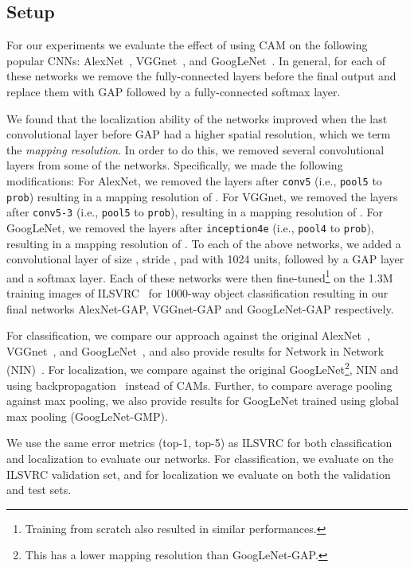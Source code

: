 \documentclass[10pt,twocolumn,letterpaper]{article}
\begin{document}
\subsection{Setup}
\label{sec:locsetup}
For our experiments we evaluate the effect of using CAM on the following popular CNNs: AlexNet~\cite{krizhevsky2012imagenet}, VGGnet~\cite{simonyan2014very}, and GoogLeNet~\cite{szegedy2014going}. In general, for each of these networks we remove the fully-connected layers before the final output and replace them with GAP followed by a fully-connected softmax layer. 

We found that the localization ability of the networks improved when the last convolutional layer before GAP had a higher spatial resolution, which we term the \textit{mapping resolution}. In order to do this, we removed several convolutional layers from some of the networks. Specifically, we made the following modifications: For AlexNet, we removed the layers after \texttt{conv5}
(i.e., \texttt{pool5} to \texttt{prob}) resulting in a mapping resolution of . For VGGnet, we removed the layers after \texttt{conv5-3} (i.e., \texttt{pool5} to \texttt{prob}), resulting in a mapping resolution of . For GoogLeNet, we removed the layers after \texttt{inception4e} (i.e., \texttt{pool4} to \texttt{prob}), resulting in a mapping resolution of . To each of the above networks, we added a convolutional layer of size , stride , pad  with 1024 units, followed by a GAP layer and a softmax layer. Each of these networks were then fine-tuned\footnote{Training from scratch also resulted in similar performances.} on the 1.3M training images of ILSVRC~\cite{ILSVRCijcv15} for 1000-way object classification resulting in our final networks AlexNet-GAP, VGGnet-GAP and GoogLeNet-GAP respectively.

For classification, we compare our approach against the original AlexNet~\cite{krizhevsky2012imagenet}, VGGnet~\cite{simonyan2014very}, and GoogLeNet~\cite{szegedy2014going}, and also provide results for Network in Network (NIN)~\cite{lin2013network}. For localization, we compare against the original GoogLeNet\footnote{This has a lower mapping resolution than GoogLeNet-GAP.}, NIN and using backpropagation~\cite{simonyan2013deep} instead of CAMs. Further, to compare average pooling against max pooling, we also provide results for GoogLeNet trained using global max pooling (GoogLeNet-GMP).

We use the same error metrics (top-1, top-5) as ILSVRC for both classification and localization to evaluate our networks. For classification, we evaluate on the ILSVRC validation set, and for localization we evaluate on both the validation and test sets. 
\end{document}
